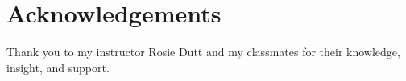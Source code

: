 \documentclass[,article,,moreauthors,pdftex]{mdpi}
\begin{document}
\hypertarget{acknowledgements}{%
\section{Acknowledgements}\label{acknowledgements}}

Thank you to my instructor Rosie Dutt and my classmates for their
knowledge, insight, and support.

%

\vspace{6pt}








\end{document}
